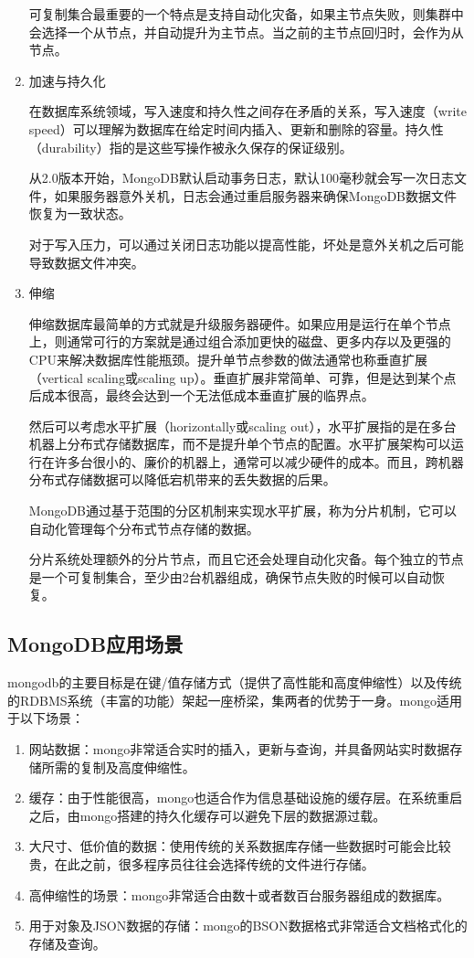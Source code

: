 \documentclass[11pt, a4paper, oneside]{ctexart}
\begin{document}
\begin{enumerate}
    可复制集合最重要的一个特点是支持自动化灾备，如果主节点失败，则集群中会选择一个从节点，并自动提升为主节点。当之前的主节点回归时，会作为从节点。
    \item 加速与持久化

     在数据库系统领域，写入速度和持久性之间存在矛盾的关系，写入速度（write speed）可以理解为数据库在给定时间内插入、更新和删除的容量。持久性（durability）指的是这些写操作被永久保存的保证级别。
     
    从2.0版本开始，MongoDB默认启动事务日志，默认100毫秒就会写一次日志文件，如果服务器意外关机，日志会通过重启服务器来确保MongoDB数据文件恢复为一致状态。
    
    对于写入压力，可以通过关闭日志功能以提高性能，坏处是意外关机之后可能导致数据文件冲突。

    \item 伸缩

    伸缩数据库最简单的方式就是升级服务器硬件。如果应用是运行在单个节点上，则通常可行的方案就是通过组合添加更快的磁盘、更多内存以及更强的CPU来解决数据库性能瓶颈。提升单节点参数的做法通常也称垂直扩展（vertical scaling或scaling up）。垂直扩展非常简单、可靠，但是达到某个点后成本很高，最终会达到一个无法低成本垂直扩展的临界点。
    
    然后可以考虑水平扩展（horizontally或scaling out），水平扩展指的是在多台机器上分布式存储数据库，而不是提升单个节点的配置。水平扩展架构可以运行在许多台很小的、廉价的机器上，通常可以减少硬件的成本。而且，跨机器分布式存储数据可以降低宕机带来的丢失数据的后果。
    
    MongoDB通过基于范围的分区机制来实现水平扩展，称为分片机制，它可以自动化管理每个分布式节点存储的数据。
    
分片系统处理额外的分片节点，而且它还会处理自动化灾备。每个独立的节点是一个可复制集合，至少由2台机器组成，确保节点失败的时候可以自动恢复。

\end{enumerate}
\subsection{MongoDB应用场景}
mongodb的主要目标是在键/值存储方式（提供了高性能和高度伸缩性）以及传统的RDBMS系统（丰富的功能）架起一座桥梁，集两者的优势于一身。mongo适用于以下场景：
\begin{enumerate}
    \item 网站数据：mongo非常适合实时的插入，更新与查询，并具备网站实时数据存储所需的复制及高度伸缩性。
    \item 缓存：由于性能很高，mongo也适合作为信息基础设施的缓存层。在系统重启之后，由mongo搭建的持久化缓存可以避免下层的数据源过载。
    \item 大尺寸、低价值的数据：使用传统的关系数据库存储一些数据时可能会比较贵，在此之前，很多程序员往往会选择传统的文件进行存储。
    \item 高伸缩性的场景：mongo非常适合由数十或者数百台服务器组成的数据库。
    \item 用于对象及JSON数据的存储：mongo的BSON数据格式非常适合文档格式化的存储及查询。
\end{enumerate}
\end{document}
